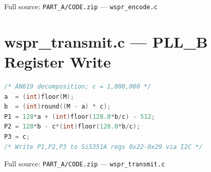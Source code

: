 \documentclass[conference]{IEEEtran}
\begin{document}
Full source: \texttt{PART\_A/CODE.zip} --- \texttt{wspr\_encode.c}

\section{wspr\_transmit.c --- PLL\_B Register Write}
\label{app:transmit}

\begin{lstlisting}[style=cstyle,language=C]
/* AN619 decomposition; c = 1,000,000 */
a  = (int)floor(M);
b  = (int)round((M - a) * c);
P1 = 128*a + (int)floor(128.0*b/c) - 512;
P2 = 128*b - c*(int)floor(128.0*b/c);
P3 = c;
/* Write P1,P2,P3 to Si5351A regs 0x22-0x29 via I2C */
\end{lstlisting}

Full source: \texttt{PART\_A/CODE.zip} --- \texttt{wspr\_transmit.c}
\end{document}
